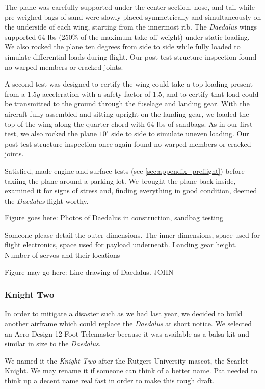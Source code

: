 \documentclass[10pt]{report}
\newcommand{\degrees}[1]
{
\begin{math}
#1^{\circ} 
\end{math}
}
\begin{document}
The plane was carefully supported under the center section, nose, and tail while pre-weighed bags of sand were slowly placed symmetrically and simultaneously on the underside of each wing, starting from the innermost rib.  The \emph{Daedalus} wings supported 64 lbs (250\% of the maximum take-off weight) under static loading.  We also rocked the plane ten degrees from side to side while fully loaded to simulate differential loads during flight. Our post-test structure inspection found no warped members or cracked joints.

A second test was designed to certify the wing could take a top loading present from a 1.5$g$ acceleration with a safety factor of 1.5, and to certify that load could be transmitted to the ground through the fuselage and landing gear. With the aircraft fully assembled and sitting upright on the landing gear, we loaded the top of the wing along the quarter chord with 64 lbs of sandbags. As in our first test, we also rocked the plane \degrees{10} side to side to simulate uneven loading. Our post-test structure inspection once again found no warped members or cracked joints.

Satisfied, made engine and surface tests (see \ref{sec:appendix_preflight}) before taxiing the plane around a parking lot.  We brought the plane back inside, examined it for signs of stress and, finding everything in good condition, deemed the \emph{Daedalus} flight-worthy.

Figure goes here: Photos of Daedalus in construction, sandbag testing

Someone please detail the outer dimensions. The inner dimensions, space used for flight electronics, space used for payload underneath. Landing gear height. Number of servos and their locations

Figure may go here: Line drawing of Daedalus. JOHN

\subsubsection{Knight Two}

In order to mitigate a disaster such as we had last year, we decided to build another airframe which could replace the \emph{Daedalus} at short notice. We selected an Aero-Design 12 Foot Telemaster \cite{aerodesign} because it was available as a balsa kit and similar in size to the \emph{Daedalus}.

We named it the \emph{Knight Two} after the Rutgers University mascot, the Scarlet Knight. We may rename it if someone can think of a better name. Pat needed to think up a decent name real fast in order to make this rough draft.
\end{document}
